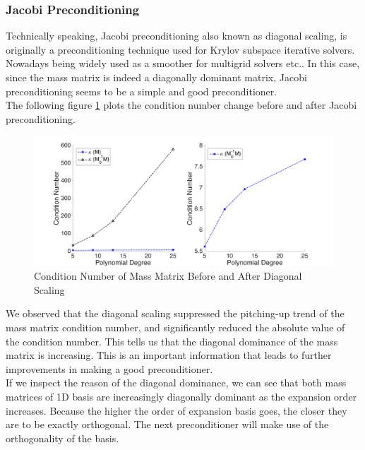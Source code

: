  \subsubsection{Jacobi Preconditioning}
 Technically speaking, Jacobi preconditioning also known as diagonal scaling, is originally a preconditioning technique used for Krylov subspace iterative solvers. Nowadays being widely used as a smoother for multigrid solvers etc.. In this case, since the mass matrix is indeed a diagonally dominant matrix, Jacobi preconditioning seems to be a simple and good preconditioner. \\  
 
 The following figure \ref{mass_precond} plots the condition number change before and after Jacobi preconditioning. 
 \begin{figure}[H]
 	\centering
 	\includegraphics[width=.95\textwidth]{mass_diag_precond}
 	\caption{Condition Number of Mass Matrix Before and After Diagonal Scaling}
 	\label{mass_precond}
 \end{figure}
 We observed that the diagonal scaling suppressed the pitching-up trend of the mass matrix condition number, and significantly reduced the absolute value of the condition number. This tells us that the diagonal dominance of the mass matrix is increasing. This is an important information that leads to further improvements in making a good preconditioner. \\

If we inspect the reason of the diagonal dominance, we can see that both mass matrices of 1D basis are increasingly diagonally dominant as the expansion order increases. Because the higher the order of expansion basis goes, the closer they are to be exactly orthogonal. The next preconditioner will make use of the orthogonality of the basis. \\ 

